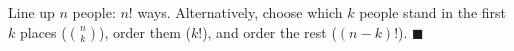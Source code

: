 Line up $n$ people: $n!$ ways. Alternatively, choose which $k$ people stand in the first $k$ places ($\binom nk$), order them ($k!$), and order the rest ($(n-k)!$). $\blacksquare$
